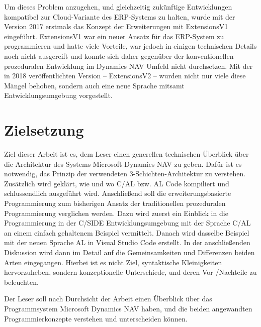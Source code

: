 Um dieses Problem anzugehen, und gleichzeitig zukünftige Entwicklungen kompatibel zur Cloud-Variante des ERP-Systems zu halten, wurde mit der Version 2017 erstmals das Konzept der Erweiterungen mit ExtensionsV1 eingeführt. ExtensionsV1 war ein neuer Ansatz für das ERP-System zu programmieren und hatte viele Vorteile, war jedoch in einigen technischen Details noch nicht ausgereift und konnte sich daher gegenüber der konventionellen prozeduralen Entwicklung im Dynamics NAV Umfeld nicht durchsetzen. Mit der in 2018 veröffentlichten Version -- ExtensionsV2 -- wurden nicht nur viele diese Mängel behoben, sondern auch eine neue Sprache mitsamt Entwicklungsumgebung vorgestellt.

\section{Zielsetzung}
\label{sec:Zielsetzung}
Ziel dieser Arbeit ist es, dem Leser einen generellen technischen Überblick über die Architektur des Systems Microsoft Dynamics NAV zu geben. Dafür ist es notwendig, das Prinzip der verwendeten 3-Schichten-Architektur zu verstehen. Zusätzlich wird geklärt, wie und wo C/AL bzw. AL Code kompiliert und schlussendlich ausgeführt wird. 
Anschließend soll die erweiterungsbasierte Programmierung zum bisherigen Ansatz der traditionellen prozeduralen Programmierung verglichen werden. Dazu wird zuerst ein Einblick in die Programmierung in der C/SIDE Entwicklungsumgebung mit der Sprache C/AL an einem einfach gehaltenem Beispiel vermittelt. Danach wird dasselbe Beispiel mit der neuen Sprache AL in Visual Studio Code erstellt. In der anschließenden Diskussion wird dann im Detail auf die Gemeinsamkeiten und Differenzen beiden Arten eingegangen. Hierbei ist es nicht Ziel, syntaktische Kleinigkeiten hervorzuheben, sondern konzeptionelle Unterschiede, und deren Vor-/Nachteile zu beleuchten. 

Der Leser soll nach Durchsicht der Arbeit einen Überblick über das Programmsystem Microsoft Dynamics NAV haben, und die beiden angewandten Programmierkonzepte verstehen und unterscheiden können.


